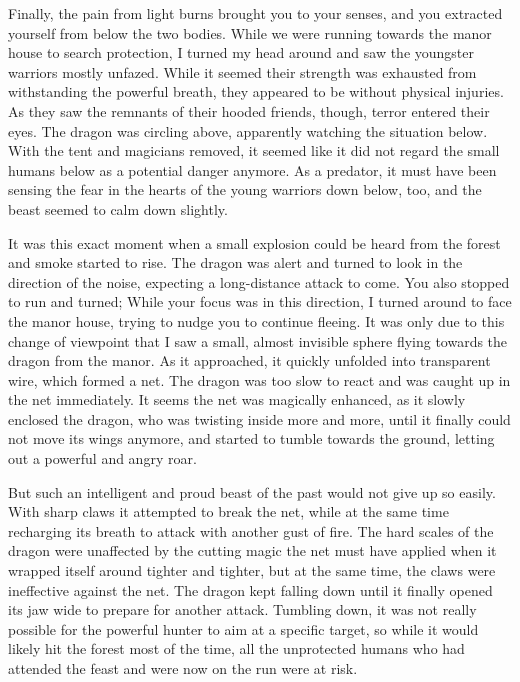 Finally, the pain from light burns brought you to your senses, and you extracted yourself from below the two bodies. While we were running towards the manor house to search protection, I turned my head around and saw the youngster warriors mostly unfazed. While it seemed their strength was exhausted from withstanding the powerful breath, they appeared to be without physical injuries. As they saw the remnants of their hooded friends, though, terror entered their eyes. The dragon was circling above, apparently watching the situation below. With the tent and magicians removed, it seemed like it did not regard the small humans below as a potential danger anymore. As a predator, it must have been sensing the fear in the hearts of the young warriors down below, too, and the beast seemed to calm down slightly.

It was this exact moment when a small explosion could be heard from the forest and smoke started to rise. The dragon was alert and turned to look in the direction of the noise, expecting a long-distance attack to come. You also stopped to run and turned; While your focus was in this direction, I turned around to face the manor house, trying to nudge you to continue fleeing. It was only due to this change of viewpoint that I saw a small, almost invisible sphere flying towards the dragon from the manor. As it approached, it quickly unfolded into transparent wire, which formed a net. The dragon was too slow to react and was caught up in the net immediately. It seems the net was magically enhanced, as it slowly enclosed the dragon, who was twisting inside more and more, until it finally could not move its wings anymore, and started to tumble towards the ground, letting out a powerful and angry roar.

But such an intelligent and proud beast of the past would not give up so easily. With sharp claws it attempted to break the net, while at the same time recharging its breath to attack with another gust of fire. The hard scales of the dragon were unaffected by the cutting magic the net must have applied when it wrapped itself around tighter and tighter, but at the same time, the claws were ineffective against the net. The dragon kept falling down until it finally opened its jaw wide to prepare for another attack. Tumbling down, it was not really possible for the powerful hunter to aim at a specific target, so while it would likely hit the forest most of the time, all the unprotected humans who had attended the feast and were now on the run were at risk.

